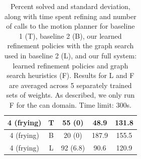 \begin{table}[t]
{\begin{tabular}{ccccc}
    \midrule[1.5pt]
      4 (frying) & T & 55 (0) & 48.9 & 131.8\\
    \midrule
      4 (frying) & B & 20 (0) & 187.9 & 155.5\\
    \midrule
      4 (frying) & L & 92 (6.8) & 90.6 & 120.9\\
    \bottomrule[1.5pt]
  \end{tabular}}
  \caption{\small{Percent solved and standard deviation, along with time spent refining and number of calls to the motion
planner for baseline 1 (T), baseline 2 (B), our learned refinement policies with the graph search used in baseline 2 (L),
and our full system: learned refinement policies and graph search heuristics (F). Results for L and F
are averaged across 5 separately trained sets of weights. As described, we only run F for the can domain. Time limit: 300s.}}
  \label{table:results}
  \vspace{-1em}
\end{table}


